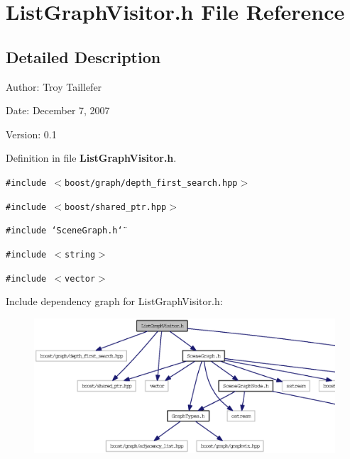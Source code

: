 \section{ListGraphVisitor.h File Reference}
\label{ListGraphVisitor_8h}


\subsection{Detailed Description}
\begin{Desc}
\item[Author:]Troy Taillefer \end{Desc}


\begin{Desc}
\item[Date:]December 7, 2007 \end{Desc}
\begin{Desc}
\item[Version:]0.1 \end{Desc}


Definition in file {\bf ListGraphVisitor.h}.

{\tt \#include $<$boost/graph/depth\_\-first\_\-search.hpp$>$}\par
{\tt \#include $<$boost/shared\_\-ptr.hpp$>$}\par
{\tt \#include \char`\"{}SceneGraph.h\char`\"{}}\par
{\tt \#include $<$string$>$}\par
{\tt \#include $<$vector$>$}\par


Include dependency graph for ListGraphVisitor.h:\nopagebreak
\begin{figure}[H]
\begin{center}
\leavevmode
\includegraphics[width=420pt]{ListGraphVisitor_8h__incl}
\end{center}
\end{figure}


